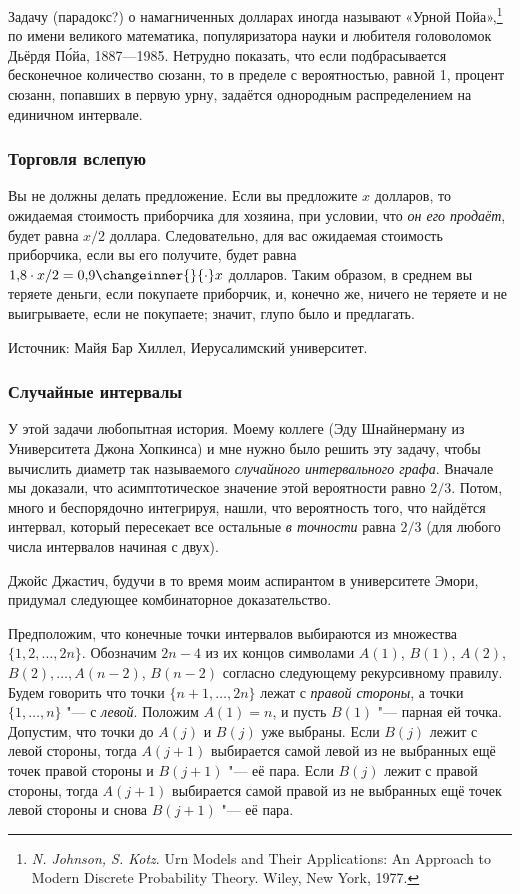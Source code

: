 \documentclass[twoside]{book}
\begin{document}
Задачу (парадокс?) о намагниченных долларах иногда называют «Урной Пойа»,\footnote{\emph{N. Johnson, S. Kotz}. {Urn Models and Their Applications: An Approach to Modern Discrete Probability Theory.} Wiley, New York, 1977.} по имени великого математика, популяризатора науки и любителя головоломок Дьёрдя П\'{о}йа, 1887---1985.
Нетрудно показать, что если подбрасывается бесконечное количество сюзанн, то в пределе с вероятностью, равной 1, процент сюзанн, попавших в первую урну, задаётся однородным распределением на единичном интервале.

\subsubsection*{Торговля вслепую}%

Вы не должны делать предложение.
Если вы предложите $x$ долларов, то ожидаемая стоимость приборчика для хозяина, при условии, что \emph{он его продаёт}, будет равна $x/2$ доллара.
Следовательно, для вас ожидаемая стоимость приборчика, если вы его получите, будет равна $1{,}8 \cdot  x/2=0{,}9\changeinner{}{\cdot} x$ долларов.
Таким образом, в среднем вы теряете деньги, если покупаете приборчик, и, конечно же, ничего не теряете и не выигрываете, если не покупаете;
значит, глупо было и предлагать.
\heart

\medskip
{\small 
  Источник: Майя Бар Хиллел, Иерусалимский университет.

  }

\subsubsection*{Случайные интервалы}%

У этой задачи любопытная история.
Моему коллеге (Эду Шнайнерману из Университета Джона Хопкинса) и мне нужно было решить эту задачу, чтобы вычислить диаметр так называемого \emph{случайного интервального графа}. 
Вначале мы доказали, что асимптотическое значение этой вероятности равно $2/3$.
Потом, много и беспорядочно интегрируя, нашли, что вероятность того, что найдётся интервал, который пересекает все остальные \emph{в точности} равна $2/3$ (для любого числа интервалов начиная с двух).

Джойс Джастич, %
будучи в то время моим аспирантом в университете Эмори, придумал следующее комбинаторное доказательство.
 
\medskip

Предположим, что конечные точки интервалов выбираются из множества $\{1,2,\dots,2n\}$.
Обозначим $2n-4$ из их концов символами $A(1)$, $B(1)$, $A(2)$, $B(2),\dots, A(n-2)$, $B(n-2)$ согласно следующему рекурсивному правилу.
Будем говорить что точки $\{n+1, \dots , 2n\}$ лежат с \emph{правой стороны}, а точки $\{1, \dots , n\}$ "--- с \emph{левой}.
Положим $A(1)=n$, и пусть $B(1)$ "--- парная ей точка.
Допустим, что точки до $A(j)$ и $B(j)$ уже выбраны. 
Если $B(j)$ лежит с левой стороны, тогда $A(j+1)$ выбирается самой левой из не выбранных ещё точек правой стороны и $B(j+1)$ "--- её пара.
Если $B(j)$ лежит с правой стороны, тогда $A(j+1)$ выбирается самой правой из не выбранных ещё точек левой стороны и снова $B(j+1)$ "--- её пара.
\end{document}
